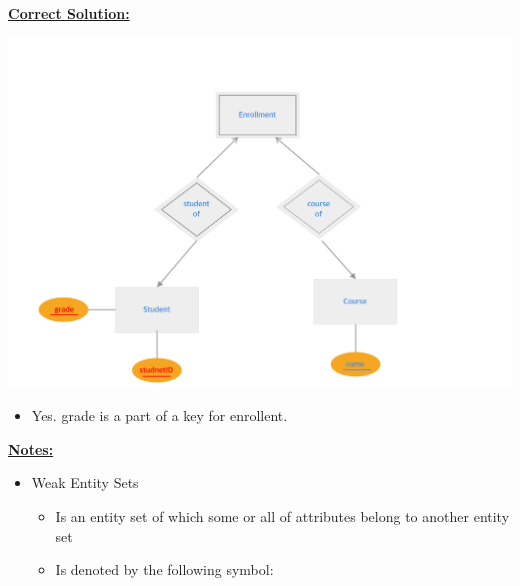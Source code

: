 \documentclass[12pt]{article}
\begin{document}
\begin{enumerate}[1.]
    \bigskip


    \begin{mdframed}

        \underline{\textbf{Correct Solution:}}

        \bigskip

        \begin{center}
        \includegraphics[width=\linewidth]{images/worksheet_14_solution_57.png}
        \end{center}

        \bigskip

        \color{red}
        \begin{itemize}
            \item Yes. grade is a part of a key for enrollent.
        \end{itemize}
        \color{black}
    \end{mdframed}

    \bigskip

    \underline{\textbf{Notes:}}

    \bigskip

    \begin{itemize}
        \item Weak Entity Sets
        \begin{itemize}
            \item Is an entity set of which some or all of attributes belong to
            another entity set
            \item Is denoted by the following symbol:


\end{itemize}
\end{itemize}
\end{enumerate}
\end{document}
